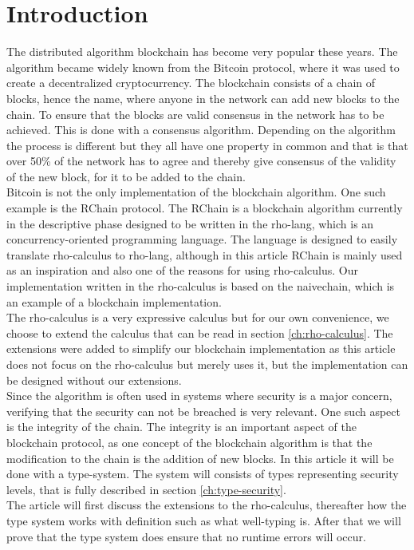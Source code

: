 \section{Introduction}
The distributed algorithm blockchain has become very popular these years. The algorithm became widely known from the Bitcoin protocol, where it was used to create a decentralized cryptocurrency\citep{website:blockchain}. The blockchain consists of a chain of blocks, hence the name, where anyone in the network can add new blocks to the chain. To ensure that the blocks are valid consensus in the network has to be achieved. This is done with a consensus algorithm. Depending on the algorithm the process is different but they all have one property in common and that is that over 50\% of the network has to agree and thereby give consensus of the validity of the new block, for it to be added to the chain.\\
Bitcoin is not the only implementation of the blockchain algorithm. One such example is the RChain protocol\citep{website:RChain}. The RChain is a blockchain algorithm currently in the descriptive phase designed to be written in the rho-lang, which is an concurrency-oriented programming language. The language is designed to easily translate rho-calculus to rho-lang\citep{website:rho-lang}, although in this article RChain is mainly used as an inspiration and also one of the reasons for using rho-calculus. Our implementation written in the rho-calculus is based on the naivechain, which is an example of a blockchain implementation\citep{naivechain}.\\

The rho-calculus is a very expressive calculus but for our own convenience, we choose to extend the calculus that can be read in section \ref{ch:rho-calculus}. The extensions were added to simplify our blockchain implementation as this article does not focus on the rho-calculus but merely uses it, but the implementation can be designed without our extensions.\\

Since the algorithm is often used in systems where security is a major concern, verifying that the security can not be breached is very relevant. One such aspect is the integrity of the chain.
The integrity is an important aspect of the blockchain protocol, as one concept of the blockchain algorithm is that the modification to the chain is the addition of new blocks. In this article it will be done with a type-system. The system will consists of types representing security levels, that is fully described in section \ref{ch:type-security}.\\

The article will first discuss the extensions to the rho-calculus, thereafter how the type system works with definition such as what well-typing is. After that we will prove that the type system does ensure that no runtime errors will occur.
